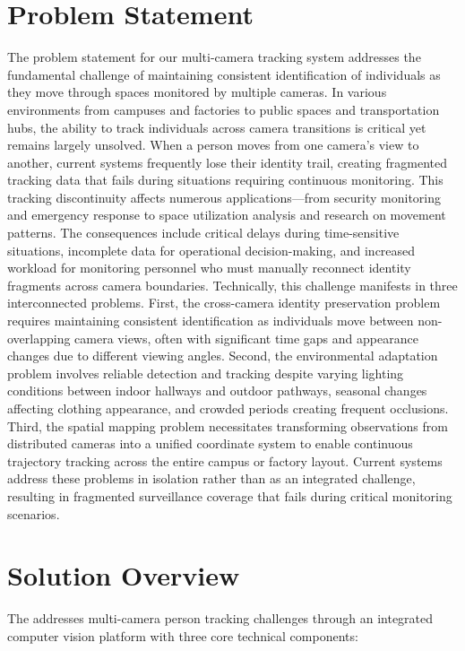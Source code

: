 \section{Problem Statement}
\label{section:problem-statement}

The problem statement for our multi-camera tracking system addresses the fundamental challenge of maintaining consistent identification of individuals as they move through spaces monitored by multiple cameras. In various environments from campuses and factories to public spaces and transportation hubs, the ability to track individuals across camera transitions is critical yet remains largely unsolved. When a person moves from one camera's view to another, current systems frequently lose their identity trail, creating fragmented tracking data that fails during situations requiring continuous monitoring. This tracking discontinuity affects numerous applications—from security monitoring and emergency response to space utilization analysis and research on movement patterns. The consequences include critical delays during time-sensitive situations, incomplete data for operational decision-making, and increased workload for monitoring personnel who must manually reconnect identity fragments across camera boundaries.
Technically, this challenge manifests in three interconnected problems. First, the cross-camera identity preservation problem requires maintaining consistent identification as individuals move between non-overlapping camera views, often with significant time gaps and appearance changes due to different viewing angles. Second, the environmental adaptation problem involves reliable detection and tracking despite varying lighting conditions between indoor hallways and outdoor pathways, seasonal changes affecting clothing appearance, and crowded periods creating frequent occlusions. Third, the spatial mapping problem necessitates transforming observations from distributed cameras into a unified coordinate system to enable continuous trajectory tracking across the entire campus or factory layout. Current systems address these problems in isolation rather than as an integrated challenge, resulting in fragmented surveillance coverage that fails during critical monitoring scenarios.

\section{Solution Overview}
\label{section:solution-overview}

The \usevar{\srsTitle} addresses multi-camera person tracking challenges through an integrated computer vision platform with three core technical components:

